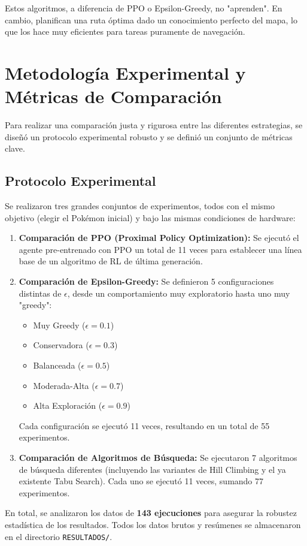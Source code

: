 \documentclass[12pt, oneside, openany]{book}
\begin{document}
Estos algoritmos, a diferencia de PPO o Epsilon-Greedy, no "aprenden". En cambio, planifican una ruta óptima dado un conocimiento perfecto del mapa, lo que los hace muy eficientes para tareas puramente de navegación.

\section{Metodología Experimental y Métricas de Comparación}
\label{sec:metodologia}

Para realizar una comparación justa y rigurosa entre las diferentes estrategias, se diseñó un protocolo experimental robusto y se definió un conjunto de métricas clave.

\subsection{Protocolo Experimental}
Se realizaron tres grandes conjuntos de experimentos, todos con el mismo objetivo (elegir el Pokémon inicial) y bajo las mismas condiciones de hardware:
\begin{enumerate}
    \item \textbf{Comparación de PPO (Proximal Policy Optimization):} Se ejecutó el agente pre-entrenado con PPO un total de 11 veces para establecer una línea base de un algoritmo de RL de última generación.
    \item \textbf{Comparación de Epsilon-Greedy:} Se definieron 5 configuraciones distintas de $\epsilon$, desde un comportamiento muy exploratorio hasta uno muy "greedy":
    \begin{itemize}
        \item Muy Greedy ($\epsilon=0.1$)
        \item Conservadora ($\epsilon=0.3$)
        \item Balanceada ($\epsilon=0.5$)
        \item Moderada-Alta ($\epsilon=0.7$)
        \item Alta Exploración ($\epsilon=0.9$)
    \end{itemize}
    Cada configuración se ejecutó 11 veces, resultando en un total de 55 experimentos.
    \item \textbf{Comparación de Algoritmos de Búsqueda:} Se ejecutaron 7 algoritmos de búsqueda diferentes (incluyendo las variantes de Hill Climbing y el ya existente Tabu Search). Cada uno se ejecutó 11 veces, sumando 77 experimentos.
\end{enumerate}
En total, se analizaron los datos de \textbf{143 ejecuciones} para asegurar la robustez estadística de los resultados. Todos los datos brutos y resúmenes se almacenaron en el directorio \texttt{RESULTADOS/}.
\end{document}
